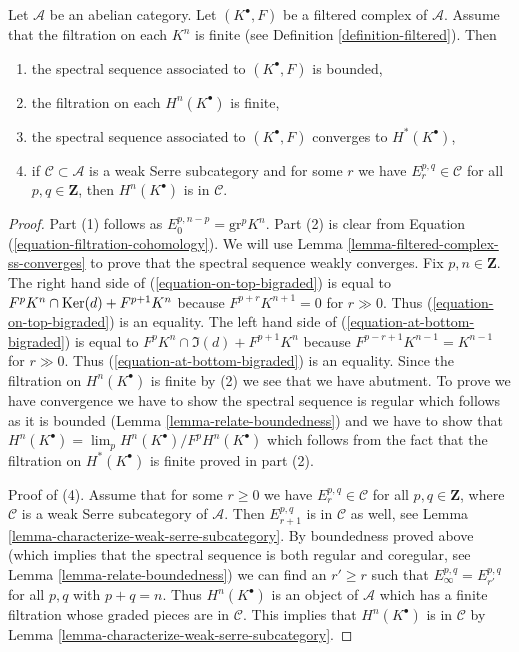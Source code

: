 \begin{lemma}
\label{lemma-biregular-ss-converges}
Let $\mathcal{A}$ be an abelian category. Let $(K^\bullet, F)$ be a
filtered complex of $\mathcal{A}$. Assume that the filtration on each $K^n$
is finite (see Definition \ref{definition-filtered}). Then
\begin{enumerate}
\item the spectral sequence associated to $(K^\bullet, F)$ is bounded,
\item the filtration on each $H^n(K^\bullet)$ is finite,
\item the spectral sequence associated to $(K^\bullet, F)$ converges
to $H^*(K^\bullet)$,
\item if $\mathcal{C} \subset \mathcal{A}$ is a weak Serre subcategory
and for some $r$ we have $E_r^{p, q} \in \mathcal{C}$ for all
$p, q \in \mathbf{Z}$, then $H^n(K^\bullet)$ is in $\mathcal{C}$.
\end{enumerate}
\end{lemma}

\begin{proof}
Part (1) follows as $E_0^{p, n - p} = \text{gr}^p K^n$.
Part (2) is clear from Equation (\ref{equation-filtration-cohomology}).
We will use Lemma \ref{lemma-filtered-complex-ss-converges} to prove
that the spectral sequence weakly converges. Fix $p, n \in \mathbf{Z}$.
The right hand side of (\ref{equation-on-top-bigraded})
is equal to $F^pK^n \cap \mathop{\mathrm{Ker}}(d) + F^{p + 1}K^n$ because
$F^{p + r}K^{n + 1} = 0$ for $r \gg 0$. Thus (\ref{equation-on-top-bigraded})
is an equality. The left hand side of (\ref{equation-at-bottom-bigraded})
is equal to $F^pK^n \cap \Im(d) + F^{p + 1}K^n$ because
$F^{p - r + 1}K^{n - 1} = K^{n - 1}$ for $r \gg 0$.
Thus (\ref{equation-at-bottom-bigraded}) is an equality. Since the filtration
on $H^n(K^\bullet)$ is finite by (2) we see that we have abutment.
To prove we have convergence we have to show the spectral sequence is
regular which follows as it is bounded
(Lemma \ref{lemma-relate-boundedness}) and we have
to show that $H^n(K^\bullet) = \lim_p H^n(K^\bullet)/F^pH^n(K^\bullet)$
which follows from the fact that the filtration on $H^*(K^\bullet)$
is finite proved in part (2).

\medskip\noindent
Proof of (4). Assume that for some $r \geq 0$ we have
$E_r^{p, q} \in \mathcal{C}$ for all $p, q \in \mathbf{Z}$, where
$\mathcal{C}$ is a weak Serre subcategory of $\mathcal{A}$. Then $E_{r + 1}^{p, q}$ is
in $\mathcal{C}$ as well, see
Lemma \ref{lemma-characterize-weak-serre-subcategory}.
By boundedness proved above (which implies that the spectral sequence
is both regular and coregular, see Lemma \ref{lemma-relate-boundedness})
we can find an $r' \geq r$ such that $E_\infty^{p, q} = E_{r'}^{p, q}$
for all $p, q$ with $p + q = n$. Thus $H^n(K^\bullet)$ is an object
of $\mathcal{A}$ which has a finite filtration whose graded pieces
are in $\mathcal{C}$. This implies that $H^n(K^\bullet)$ is in $\mathcal{C}$
by Lemma \ref{lemma-characterize-weak-serre-subcategory}.
\end{proof}

